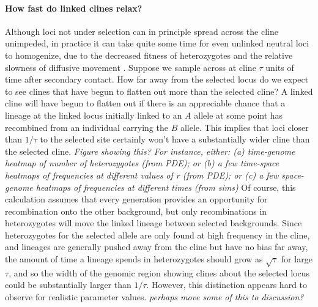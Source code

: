 \documentclass[12pt]{article}
\newcommand{\alisa}[1]{{\em \color{red} #1}}
\newcommand{\plr}[1]{{\em \color{blue} #1}}
\begin{document}
\paragraph{How fast do linked clines relax?}
Although loci not under selection can in principle spread across the cline unimpeded,
in practice it can take quite some time for even unlinked neutral loci to homogenize,
due to the decreased fitness of heterozygotes \citep{Barton1986}
and the relative slowness of diffusive movement \citep{Sedghifar2015}.
Suppose we sample across at cline $\tau$ units of time after secondary contact.
How far away from the selected locus do we expect to see clines that have begun to flatten out more
than the selected cline?
A linked cline will have begun to flatten out if there is an appreciable chance that
a lineage at the linked locus initially linked to an $A$ allele 
at some point has recombined from an individual carrying the $B$ allele.
This implies that loci closer than $1/\tau$ to the selected site
certainly won't have a substantially wider cline than the selected cline.
\plr{Figure showing this? 
    For instance, either: (a) time-genome heatmap of number of heterozygotes (from PDE);
    or (b) a few time-space heatmaps of frequencies at different values of r (from PDE);
    or (c) a few space-genome heatmaps of frequencies at different times (from sims)
}
Of course, this calculation assumes that every generation provides an opportunity for recombination 
onto the other background,
but only recombinations in heterozygotes will move the linked lineage between selected backgrounds.
Since heterozygotes for the selected allele are only found at high frequency in the cline,
and lineages are generally pushed away from the cline but have no bias far away,
the amount of time a lineage spends in heterozygotes should grow as $\sqrt{\tau}$ for large $\tau$,
and so the width of the genomic region showing clines about the selected locus could be 
substantially larger than $1/\tau$.
However, this distinction appears hard to observe for realistic parameter values. \alisa{perhaps move some of this to discussion?}
\end{document}
